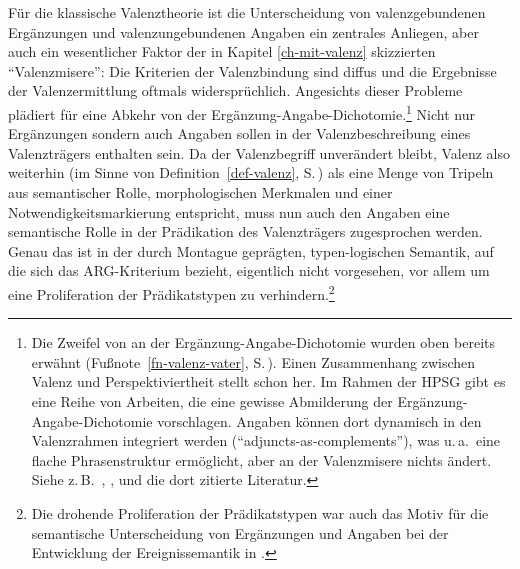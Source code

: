 Für die klassische Valenztheorie ist die Unterscheidung von valenzgebundenen Ergänzungen und valenzungebundenen Angaben ein zentrales Anliegen, aber auch ein wesentlicher Faktor der in Kapitel \ref{ch-mit-valenz} skizzierten "`Valenzmisere"': Die Kriterien der Valenzbindung sind diffus und die Ergebnisse der Valenzermittlung oftmals widersprüchlich. Angesichts dieser Probleme plädiert \cite{Storrer:92} für eine Abkehr von der Ergänzung-Angabe-Dichotomie.\footnote{Die Zweifel von \cite{Vater:78} an der Ergänzung-Angabe-Dichotomie wurden oben bereits erwähnt (Fußnote~\ref{fn-valenz-vater}, S.\,\pageref{fn-valenz-vater}). Einen Zusammenhang zwischen Valenz und Perspektiviertheit stellt schon \cite{Heringer:84} her. Im Rahmen der HPSG gibt es eine Reihe von Arbeiten, die eine gewisse Abmilderung der Ergänzung-Angabe-Dichotomie vorschlagen. Angaben können dort dynamisch in den Valenzrahmen integriert werden ("`adjuncts-as-complements"'), was u.\,a.\ eine flache Phrasenstruktur ermöglicht, aber an der Valenzmisere nichts ändert. Siehe z.\,B.\ \citet[Kapitel~9]{Przepiorkowski:99}, \cite{Bouma:etal:01}, \cite{Bouma:03} und die dort zitierte Literatur.} Nicht nur Ergänzungen sondern auch Angaben sollen in der Valenzbeschreibung eines Valenzträgers enthalten sein. Da der Valenzbegriff unverändert bleibt, Valenz also weiterhin (im Sinne von Definition~\ref{def-valenz}, S.\,\pageref{def-valenz}) als eine Menge von Tripeln aus semantischer Rolle, morphologischen Merkmalen und einer Notwendigkeitsmarkierung entspricht, muss nun auch den Angaben eine semantische Rolle in der Prädikation des Valenzträgers zugesprochen werden. Genau das ist in der durch Montague geprägten, typen-logischen Semantik, auf die sich das ARG-Kriterium bezieht, eigentlich nicht vorgesehen, vor allem um eine Proliferation der Prädikatstypen zu verhindern.\footnote{Die drohende Proliferation der Prädikatstypen war auch das Motiv für die semantische Unterscheidung von Ergänzungen und Angaben bei der Entwicklung der Ereignissemantik in \cite{Davidson:67}.} 

